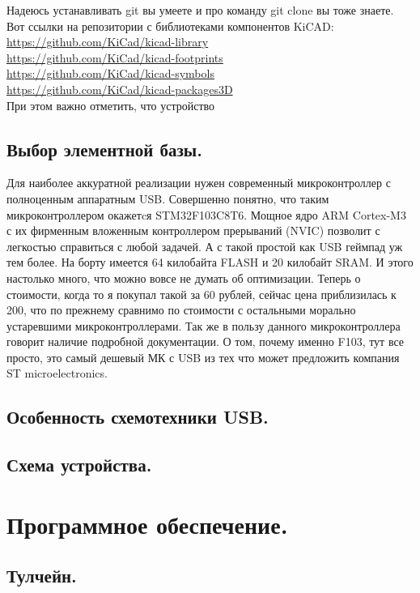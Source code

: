 \documentclass[12pt,a4paper]{scrbook} %
\begin{document}
    Надеюсь устанавливать git вы умеете и про команду git clone вы тоже знаете.
    Вот ссылки на репозитории с библиотеками компонентов KiCAD:\\
    \url{https://github.com/KiCad/kicad-library}\\
    \url{https://github.com/KiCad/kicad-footprints}\\
    \url{https://github.com/KiCad/kicad-symbols}\\
    \url{https://github.com/KiCad/kicad-packages3D}\\

    При этом важно отметить, что устройство

\subsection{Выбор элементной базы.}
    Для наиболее аккуратной реализации нужен современный микроконтроллер с
    полноценным аппаратным USB. Совершенно понятно, что таким микроконтроллером
    окажетcя STM32F103C8T6. Мощное ядро ARM Cortex-M3 с их фирменным вложенным
    контроллером прерываний (NVIC) позволит с легкостью справиться с любой
    задачей. А с такой простой как USB геймпад уж тем более. На борту имеется
    64 килобайта FLASH и 20 килобайт SRAM. И этого настолько много, что можно
    вовсе не думать об оптимизации. Теперь о стоимости, когда то я покупал такой
    за 60 рублей, сейчас цена приблизилась к 200, что по прежнему сравнимо по
    стоимости с остальными морально устаревшими микроконтроллерами. Так же в
    пользу данного микроконтроллера говорит наличие подробной
    документации. О том, почему именно F103, тут все просто, это самый дешевый
    МК с USB из тех что может предложить компания ST microelectronics.
\subsection{Особенность схемотехники USB.}
\subsection{Схема устройства.}

\section{Программное обеспечение.}

    \subsection{Тулчейн.}
\end{document}
